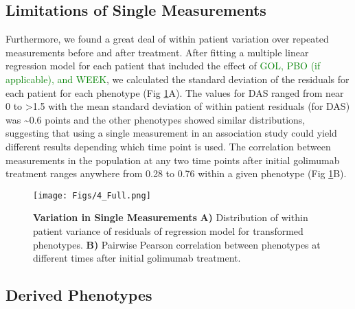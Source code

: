 \subsection*{Limitations of Single Measurements}

Furthermore, we found a great deal of within patient variation over repeated measurements before and after treatment. After fitting a multiple linear regression model for each patient that included the effect of \textcolor{green}{GOL, PBO (if applicable), and WEEK}, we calculated the standard deviation of the residuals for each patient for each phenotype (Fig \ref{FIG_4}A). The values for DAS ranged from near 0 to \textgreater1.5 with the mean standard deviation of within patient residuals (for DAS) was \textasciitilde0.6 points and the other phenotypes showed similar distributions, suggesting that using a single measurement in an association study could yield different results depending which time point is used. The correlation between measurements in the population at any two time points after initial golimumab treatment ranges anywhere from 0.28 to 0.76 within a given phenotype (Fig \ref{FIG_4}B).

\begin{figure}[h!]
  \centering
  \texttt{[image: Figs/4\_Full.png]}
  \caption{ {\bf Variation in Single Measurements} {\bf A)} Distribution of within patient variance of residuals of regression model for transformed phenotypes. {\bf B)} Pairwise Pearson correlation between phenotypes at different times after initial golimumab treatment. }
  \label{FIG_4}
\end{figure}

\subsection*{Derived Phenotypes}

